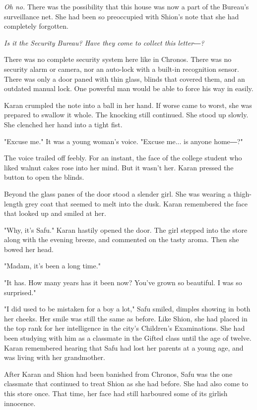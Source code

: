 \emph{Oh no.} There was the possibility that this house was now a part of the
Bureau's surveillance net. She had been so preoccupied with Shion's note
that she had completely forgotten.

\emph{Is it the Security Bureau? Have they come to collect this letter―?}

There was no complete security system here like in Chronos. There was no
security alarm or camera, nor an auto-lock with a built-in recognition
sensor. There was only a door paned with thin glass, blinds that covered
them, and an outdated manual lock. One powerful man would be able to
force his way in easily.

Karan crumpled the note into a ball in her hand. If worse came to worst,
she was prepared to swallow it whole. The knocking still continued. She
stood up slowly. She clenched her hand into a tight fist.

"Excuse me." It was a young woman's voice. "Excuse me... is anyone
home―?"

The voice trailed off feebly. For an instant, the face of the college
student who liked walnut cakes rose into her mind. But it wasn't her.
Karan pressed the button to open the blinds.

Beyond the glass panes of the door stood a slender girl. She was wearing
a thigh-length grey coat that seemed to melt into the dusk. Karan
remembered the face that looked up and smiled at her.

"Why, it's Safu." Karan hastily opened the door. The girl stepped into
the store along with the evening breeze, and commented on the tasty
aroma. Then she bowed her head.

"Madam, it's been a long time."

"It has. How many years has it been now? You've grown so beautiful. I
was so surprised."

"I did used to be mistaken for a boy a lot," Safu smiled, dimples
showing in both her cheeks. Her smile was still the same as before. Like
Shion, she had placed in the top rank for her intelligence in the city's
Children's Examinations. She had been studying with him as a classmate
in the Gifted class until the age of twelve. Karan remembered hearing
that Safu had lost her parents at a young age, and was living with her
grandmother.

After Karan and Shion had been banished from Chronos, Safu was the one
classmate that continued to treat Shion as she had before. She had also
come to this store once. That time, her face had still harboured some of
its girlish innocence.


